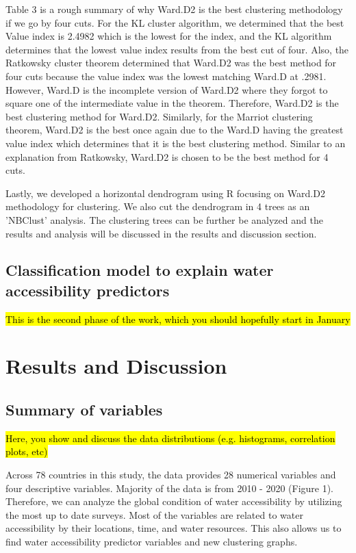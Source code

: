 \documentclass[10pt,twoside]{article}
\numberwithin{equation}{section}
\newcommand{\?}{\stackrel{?}{=}}
\begin{document}
Table 3 is a rough summary of why Ward.D2 is the best clustering methodology if we go by four cuts. For the KL cluster algorithm, we determined that the best Value index is 2.4982 which is the lowest for the index, and the KL algorithm determines that the lowest value index results from the best cut of four. Also, the Ratkowsky cluster theorem determined that Ward.D2 was the best method for four cuts because the value index was the lowest matching Ward.D at .2981. However, Ward.D is the incomplete version of Ward.D2 where they forgot to square one of the intermediate value in the theorem. Therefore, Ward.D2 is the best clustering method for Ward.D2. Similarly, for the Marriot clustering theorem, Ward.D2 is the best once again due to the Ward.D having the greatest value index which determines that it is the best clustering method. Similar to an explanation from Ratkowsky, Ward.D2 is chosen to be the best method for 4 cuts.

Lastly, we developed a horizontal dendrogram using R focusing on Ward.D2 methodology for clustering. We also cut the dendrogram in 4 trees as an 'NBClust' analysis. The clustering trees can be further be analyzed and the results and analysis will be discussed in the results and discussion section. 



\subsection*{Classification model to explain water accessibility predictors}
\hl{This is the second phase of the work, which you should hopefully start in January}


\section*{Results and Discussion}
\subsection*{Summary of variables}
\hl{Here, you show and discuss the data distributions (e.g. histograms, correlation plots, etc)}

Across 78 countries in this study, the data provides 28 numerical variables and four descriptive variables. Majority of the data is from 2010 - 2020 (Figure 1). Therefore, we can analyze the global condition of water accessibility by utilizing the most up to date surveys. Most of the variables are related to water accessibility by their locations, time, and water resources. This also allows us to find water accessibility predictor variables and new clustering graphs. 
\end{document}
